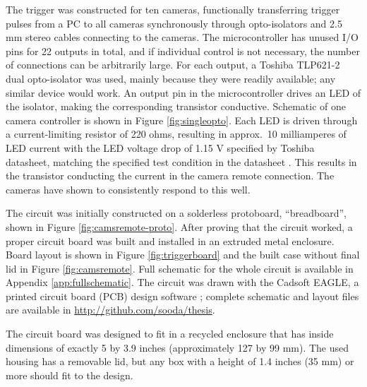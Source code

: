 The trigger was constructed for ten cameras, functionally transferring trigger pulses from a PC to all cameras synchronously through opto-isolators and 2.5 mm stereo cables connecting to the cameras.
The microcontroller has unused I/O pins for 22 outputs in total, and if individual control is not necessary, the number of connections can be arbitrarily large.
For each output, a Toshiba TLP621-2 dual opto-isolator was used, mainly because they were readily available; any similar device would work.
An output pin in the microcontroller drives an LED of the isolator, making the corresponding transistor conductive.
Schematic of one camera controller is shown in Figure \ref{fig:singleopto}.
Each LED is driven through a current-limiting resistor of 220 ohms, resulting in approx.\ 10 milliamperes of LED current with the LED voltage drop of 1.15 V specified by Toshiba datasheet, matching the specified test condition in the datasheet \cite{tlp621}.
This results in the transistor conducting the current in the camera remote connection.
The cameras have shown to consistently respond to this well.

The circuit was initially constructed on a solderless protoboard, ``breadboard'', shown in Figure \ref{fig:camsremote-proto}.
After proving that the circuit worked, a proper circuit board was built and installed in an extruded metal enclosure.
Board layout is shown in Figure \ref{fig:triggerboard} and the built case without final lid in Figure \ref{fig:camsremote}.
Full schematic for the whole circuit is available in Appendix \ref{app:fullschematic}.
The circuit was drawn with the Cadsoft EAGLE, a printed circuit board (PCB) design software \cite{eaglepcb}; complete schematic and layout files are available in \url {http://github.com/sooda/thesis}.

The circuit board was designed to fit in a recycled enclosure that has inside dimensions of exactly 5 by 3.9 inches (approximately 127 by 99 mm).
The used housing has a removable lid, but any box with a height of 1.4 inches (35 mm) or more should fit to the design.


